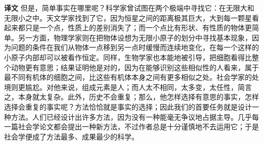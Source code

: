 \documentclass[UTF8,zihao=-4]{ctexart}
\newcommand{\BodyFont}{\fontsize{10.5pt}{15.5pt}\selectfont}
\newcommand{\translabel}{\textbf{译文}\quad}
\newenvironment{zhblock}{\par\noindent\begingroup\BodyFont\translabel}{\par\endgroup\vspace{0.35em}}
\begin{document}
\begin{zhblock}
但是，简单事实在哪里呢？科学家曾试图在两个极端中寻找它：在无限大和无限小之中。天文学家找到了它，因为恒星之间的距离极其巨大，大到每一颗星看起来都只是一个点，性质上的差别消失了；而一个点比有形状、有性质的物体更简单。另一方面，物理学家则在把物体设想为无限小原子的划分中寻找基本现象，因为问题的条件在我们从物体一点移到另一点时缓慢而连续地变化，在每一个这样的小原子内部却可以被看作恒定。同样，生物学家也本能地被引导，把细胞看得比整个动物更有意思；结果证明他是对的，因为在能够识别这些相似性的人看来，属于最不同有机体的细胞之间，比这些有机体本身之间有更多相似之处。社会学家的处境则更尴尬。对他来说，组成元素是人；而人太不相同，太多变，太任性，简言之，本身就太复杂。此外，历史不会重复；那么，他怎样选择有意思的事实，怎样选择会重复的事实呢？方法恰恰就是事实的选择；因此我们的首要任务就是设计一种方法。人们已经设计出许多方法，因为没有一种能毫无争议地占据主导。几乎每一篇社会学论文都会提出一种新方法，不过作者总是十分谨慎地不去运用它；于是社会学便成了方法最多、成果最少的科学。\end{zhblock}
\end{document}
